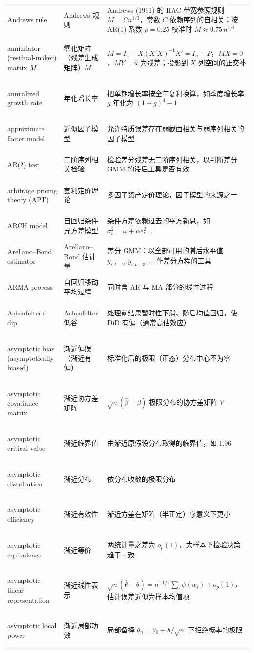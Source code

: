 \begin{longtable}{@{}>{\bfseries\boldmath\raggedright\arraybackslash}p{4.6cm}>{\raggedright\arraybackslash}p{3.2cm}>{\raggedright\arraybackslash}p{\dimexpr\textwidth-7.8cm-4\tabcolsep\relax}@{}}
Andrews rule & Andrews 规则 & Andrews (1991) 的 HAC 带宽参照规则 $M=Cn^{1/3}$，常数 $C$ 依赖序列的自相关；按 AR(1) 系数 $\rho=0.25$ 校准时 $M\approx0.75\,n^{1/3}$ \\
annihilator (residual-maker) matrix $M$ & 零化矩阵（残差生成矩阵）$M$ & $M=I_n-X(X'X)^{-1}X'=I_n-P$，$MX=0$，$MY=\hat u$ 为残差；投影到 $X$ 列空间的正交补 \\
annualized growth rate & 年化增长率 & 把单期增长率按全年复利换算，如季度增长率 $g$ 年化为 $(1+g)^4-1$ \\
approximate factor model & 近似因子模型 & 允许特质误差存在弱截面相关与弱序列相关的因子模型 \\
AR(2) test & 二阶序列相关检验 & 检验差分残差无二阶序列相关，以判断差分 GMM 的滞后工具是否有效 \\
arbitrage pricing theory (APT) & 套利定价理论 & 多因子资产定价理论，因子模型的来源之一 \\
ARCH model & 自回归条件异方差模型 & 条件方差依赖过去的平方新息，如 $\sigma_t^2=\omega+\alpha e_{t-1}^2$ \\
Arellano--Bond estimator & Arellano--Bond 估计量 & 差分 GMM：以全部可用的滞后水平值 $y_{i,t-2},y_{i,t-3},\dots$ 作差分方程的工具 \\
ARMA process & 自回归移动平均过程 & 同时含 AR 与 MA 部分的线性过程 \\
Ashenfelter's dip & Ashenfelter 低谷 & 处理前结果暂时性下滑、随后均值回归，使 DiD 有偏（通常高估效应） \\
asymptotic bias (asymptotically biased) & 渐近偏误（渐近有偏） & 标准化后的极限（正态）分布中心不为零 \\
asymptotic covariance matrix & 渐近协方差矩阵 & $\sqrt n(\hat\beta-\beta)$ 极限分布的协方差矩阵 $V$ \\
asymptotic critical value & 渐近临界值 & 由渐近原假设分布取得的临界值，如 1.96 \\
asymptotic distribution & 渐近分布 & 依分布收敛的极限分布 \\
asymptotic efficiency & 渐近有效性 & 渐近方差在矩阵（半正定）序意义下更小 \\
asymptotic equivalence & 渐近等价 & 两统计量之差为 $o_p(1)$，大样本下检验决策趋于一致 \\
asymptotic linear representation & 渐近线性表示 & $\sqrt n(\hat\theta-\theta)=n^{-1/2}\sum_i\psi(w_i)+o_p(1)$，估计误差近似为样本均值项 \\
asymptotic local power & 渐近局部功效 & 局部备择 $\theta_n=\theta_0+h/\sqrt n$ 下拒绝概率的极限 \\

\end{longtable}
